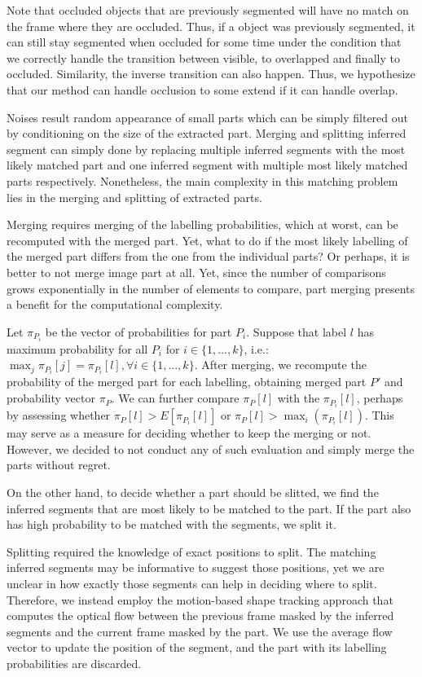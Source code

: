 \documentclass{article}
\begin{document}
Note that occluded objects that are previously segmented will have no match on the frame where they are occluded. Thus, if a object was previously segmented, it can still stay segmented when occluded for some time under the condition that we correctly handle the transition between visible, to overlapped and finally to occluded. Similarity, the inverse transition can also happen. Thus, we hypothesize that our method can handle occlusion to some extend if it can handle overlap.

Noises result random appearance of small parts which can be simply filtered out by conditioning on the size of the extracted part. Merging and splitting inferred segment can simply done by replacing multiple inferred segments with the most likely matched part and one inferred segment with multiple most likely matched parts respectively. Nonetheless, the main complexity in this matching problem lies in the merging and splitting of extracted parts. 

Merging requires merging of the labelling probabilities, which at worst, can be recomputed with the merged part. Yet, what to do if the most likely labelling of the merged part differs from the one from the individual parts? Or perhaps, it is better to not merge image part at all. Yet, since the number of comparisons grows exponentially in the number of elements to compare, part merging presents a benefit for the computational complexity.

Let $\pi_{P_i}$ be the vector of probabilities for part $P_i$. Suppose that label $l$ has maximum probability for all $P_i$ for $i\in \{1,...,k\}$, i.e.: $\max_j \pi_{P_i}[j] = \pi_{P_i}[l],  \forall i\in \{1,...,k\}$. After merging, we recompute the probability of the merged part for each labelling, obtaining merged part $P'$ and probability vector $\pi_P$. We can further compare $\pi_P[l]$ with the $\pi_{P_i}[l]$, perhaps by assessing whether $\pi_P[l] > E[\pi_{P_i}[l]]$ or $\pi_P[l] > \max_i (\pi_{P_i}[l])$. This may serve as a measure for deciding whether to keep the merging or not. However, we decided to not conduct any of such evaluation and simply merge the parts without regret.

On the other hand, to decide whether a part should be slitted, we find the inferred segments that are most likely to be matched to the part. If the part also has high probability to be matched with the segments, we split it. 

Splitting required the knowledge of exact positions to split. The matching inferred segments may be informative to suggest those positions, yet we are unclear in how exactly those segments can help in deciding where to split. Therefore, we instead employ the motion-based shape tracking approach that computes the optical flow between the previous frame masked by the inferred segments and the current frame masked by the part. We use the average flow vector to update the position of the segment, and the part with its labelling probabilities are discarded. 
\end{document}
